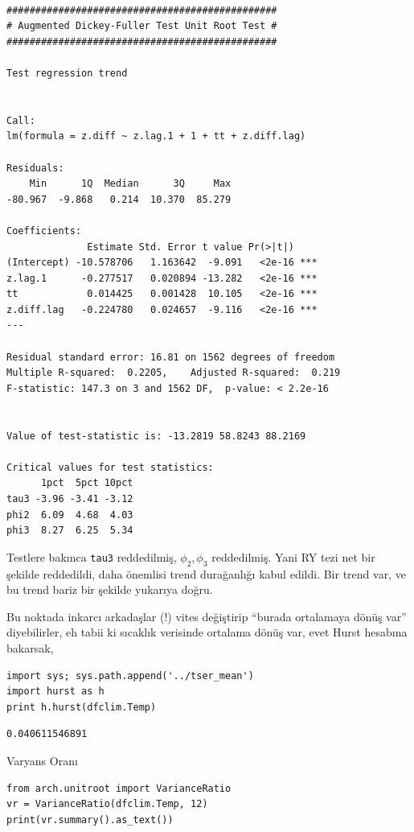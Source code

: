 \documentclass[12pt,fleqn]{article}\usepackage{../../common}
\begin{document}
\begin{verbatim}

############################################### 
# Augmented Dickey-Fuller Test Unit Root Test # 
############################################### 

Test regression trend 


Call:
lm(formula = z.diff ~ z.lag.1 + 1 + tt + z.diff.lag)

Residuals:
    Min      1Q  Median      3Q     Max 
-80.967  -9.868   0.214  10.370  85.279 

Coefficients:
              Estimate Std. Error t value Pr(>|t|)    
(Intercept) -10.578706   1.163642  -9.091   <2e-16 ***
z.lag.1      -0.277517   0.020894 -13.282   <2e-16 ***
tt            0.014425   0.001428  10.105   <2e-16 ***
z.diff.lag   -0.224780   0.024657  -9.116   <2e-16 ***
---

Residual standard error: 16.81 on 1562 degrees of freedom
Multiple R-squared:  0.2205,	Adjusted R-squared:  0.219 
F-statistic: 147.3 on 3 and 1562 DF,  p-value: < 2.2e-16


Value of test-statistic is: -13.2819 58.8243 88.2169 

Critical values for test statistics: 
      1pct  5pct 10pct
tau3 -3.96 -3.41 -3.12
phi2  6.09  4.68  4.03
phi3  8.27  6.25  5.34
\end{verbatim}

Testlere bakınca \verb!tau3! reddedilmiş, $\phi_2,\phi_3$ reddedilmiş. Yani
RY tezi net bir şekilde reddedildi, daha önemlisi trend durağanlığı kabul
edildi. Bir trend var, ve bu trend bariz bir şekilde yukarıya doğru. 

Bu noktada inkarcı arkadaşlar (!) vites değiştirip ``burada ortalamaya
dönüş var'' diyebilirler, eh tabii ki sıcaklık verisinde ortalama dönüş
var, evet Hurst hesabına bakarsak,

\begin{verbatim}
import sys; sys.path.append('../tser_mean')
import hurst as h
print h.hurst(dfclim.Temp)
\end{verbatim}

\begin{verbatim}
0.040611546891
\end{verbatim}

Varyans Oranı

\begin{verbatim}
from arch.unitroot import VarianceRatio
vr = VarianceRatio(dfclim.Temp, 12)
print(vr.summary().as_text())
\end{verbatim}
\end{document}

